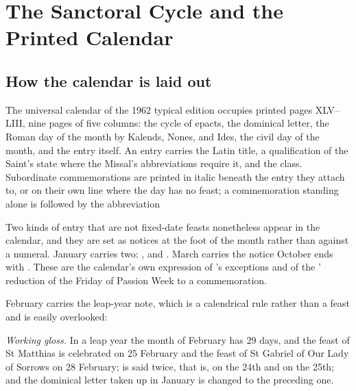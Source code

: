 \section{The Sanctoral Cycle and the Printed Calendar}
\label{sec:sanctoral}

\subsection{How the calendar is laid out}

The universal calendar of the 1962 typical edition occupies printed pages XLV--LIII, nine pages
of five columns: the cycle of epacts, the dominical letter, the Roman day of the month by
Kalends, Nones, and Ides, the civil day of the month, and the entry itself. An entry carries the
Latin title, a qualification of the Saint's state where the Missal's abbreviations require it,
and the class. Subordinate commemorations are printed in italic beneath the entry they attach
to, or on their own line where the day has no feast; a commemoration standing alone is followed
by the abbreviation 

Two kinds of entry that are not fixed-date feasts nonetheless appear in the calendar, and they
are set as notices at the foot of the month rather than against a numeral. January carries two:
, and . March carries the notice  October ends with
. These are the calendar's
own expression of 's exceptions and of the ' reduction of the Friday
of Passion Week to a commemoration.

February carries the leap-year note, which is a calendrical rule rather than a feast and is
easily overlooked:

\begin{studyframe}
\medskip

\textit{Working gloss.} In a leap year the month of February has 29 days, and the feast of
St Matthias is celebrated on 25 February and the feast of St Gabriel of Our Lady of Sorrows on
28 February;  is said twice, that is, on the 24th and on the 25th; and the
dominical letter taken up in January is changed to the preceding one.
\end{studyframe}

